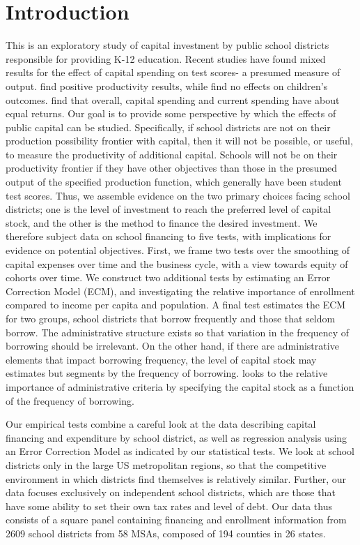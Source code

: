 \section{Introduction}

This is an exploratory study of capital investment by public school districts responsible for providing K-12 education. Recent studies have found mixed results for the effect of capital spending on test scores- a presumed measure of output. \cite{biasi_what_2024} find positive productivity results, while \cite{cellini_value_2010} find no effects on children’s outcomes. \cite{jackson_what_2024} find that overall, capital spending and current spending have about equal returns. Our goal is to provide some perspective by which the effects of public capital can be studied. Specifically, if school districts are not on their production possibility frontier with capital, then it will not be possible, or useful, to measure the productivity of additional capital. Schools will not be on their productivity frontier if they have other objectives than those in the presumed output of the specified production function, which generally have been student test scores. Thus, we assemble evidence on the two primary choices facing school districts; one is the level of investment to reach the preferred level of capital stock, and the other is the method to finance the desired investment. We therefore subject data on school financing to five tests, with implications for evidence on potential objectives. First, we frame two tests over the smoothing of capital expenses over time and the business cycle, with a view towards equity of cohorts over time. We construct two additional tests by estimating an Error Correction Model (ECM), and investigating the relative importance of enrollment compared to income per capita and population. A final test estimates the ECM for two groups, school districts that borrow frequently and those that seldom borrow. The administrative structure exists so that variation in the frequency of borrowing should be irrelevant. On the other hand, if there are administrative elements that impact borrowing frequency, the level of capital stock may estimates but segments by the frequency of borrowing. looks to the relative importance of administrative criteria by specifying the capital stock as a function of the frequency of borrowing.

Our empirical tests combine a careful look at the data describing capital financing and expenditure by school district, as well as regression analysis using an Error Correction Model as indicated by our statistical tests. We look at school districts only in the large US metropolitan regions, so that the competitive environment in which districts find themselves is relatively similar. Further, our data focuses exclusively on independent school districts, which are those that have some ability to set their own tax rates and level of debt. Our data thus consists of a square panel containing financing and enrollment information from 2609 school districts from 58 MSAs, composed of 194 counties in 26 states. 


